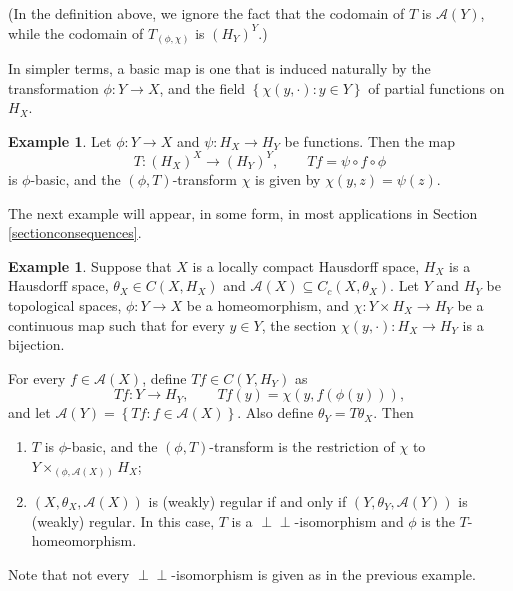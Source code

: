 \documentclass[letter,11pt]{amsart}
\theoremstyle{plain}		\newtheorem{theorem}[generalnumbering]{Theorem}
\theoremstyle{plain}		\newtheorem{corollary}[generalnumbering]{Corollary}
\theoremstyle{definition}		\newtheorem{definition}[generalnumbering]{Definition}
\theoremstyle{definition}		\newtheorem{example}[generalnumbering]{Example}
\theoremstyle{plain}		\newtheorem{proposition}[generalnumbering]{Proposition}
\theoremstyle{plain}		\newtheorem{lemma}[generalnumbering]{Lemma}
\theoremstyle{definition}
\newcommand{\perpp}{\perp\!\!\!\perp}
\begin{document}
(In the definition above, we ignore the fact that the codomain of $T$ is $\mathcal{A}(Y)$, while the codomain of $T_{(\phi,\chi)}$ is $(H_Y)^Y$.)

In simpler terms, a basic map is one that is induced naturally by the transformation $\phi\colon Y\to X$, and the field $\left\{\chi(y,\cdot):y\in Y\right\}$ of partial functions on $H_X$.

\begin{example}
	Let $\phi\colon Y\to X$ and $\psi\colon H_X\to H_Y$ be functions. Then the map
	\[T\colon(H_X)^X\to (H_Y)^Y,\qquad Tf=\psi\circ f\circ \phi\]
	is $\phi$-basic, and the $(\phi,T)$-transform $\chi$ is given by $\chi(y,z)=\psi(z)$.
\end{example}

The next example will appear, in some form, in most applications in Section \ref{sectionconsequences}.

\begin{example}
	Suppose that $X$ is a locally compact Hausdorff space, $H_X$ is a Hausdorff space, $\theta_X\in C(X,H_X)$ and $\mathcal{A}(X)\subseteq C_c(X,\theta_X)$. Let $Y$ and $H_Y$ be topological spaces, $\phi\colon Y\to X$ be a homeomorphism, and $\chi\colon Y\times H_X\to H_Y$ be a continuous map such that for every $y\in Y$, the section $\chi(y,\cdot)\colon H_X\to H_Y$ is a bijection.
	
	For every $f\in\mathcal{A}(X)$, define $Tf\in C(Y,H_Y)$ as
	\[Tf\colon Y\to H_Y,\qquad Tf(y)=\chi(y,f(\phi(y))),\]
	and let $\mathcal{A}(Y)=\left\{Tf\colon f\in\mathcal{A}(X)\right\}$. Also define $\theta_Y=T\theta_X$. Then
	\begin{enumerate}[label=\arabic*.]
		\item $T$ is $\phi$-basic, and the $(\phi,T)$-transform is the restriction of $\chi$ to $Y\times_{(\phi,\mathcal{A}(X))} H_X$;
		\item $(X,\theta_X,\mathcal{A}(X))$ is (weakly) regular if and only if $(Y,\theta_Y,\mathcal{A}(Y))$ is (weakly) regular. In this case, $T$ is a $\perpp$-isomorphism and $\phi$ is the $T$-homeomorphism.
	\end{enumerate}
\end{example}

Note that not every $\perpp$-isomorphism is given as in the previous example.
\end{document}
